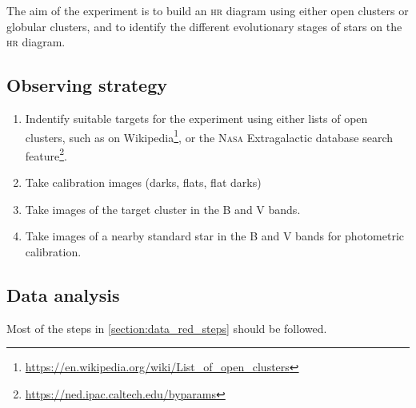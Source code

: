 \documentclass[a4paper, 11pt, fleqn]{memoir}
\begin{document}
The aim of the experiment is to build an \textsc{hr} diagram using either open clusters or globular clusters, and to identify the different evolutionary stages of stars on the \textsc{hr} diagram.

\subsection{Observing strategy}
\begin{enumerate}
    \item Indentify suitable targets for the experiment using either lists of open clusters, such as on Wikipedia\footnote{\url{https://en.wikipedia.org/wiki/List_of_open_clusters}}, or the \textsc{Nasa} Extragalactic database search feature\footnote{\url{https://ned.ipac.caltech.edu/byparams}}.
    \item Take calibration images (darks, flats, flat darks)
    \item Take images of the target cluster in the B and V bands.
    \item Take images of a nearby standard star in the B and V bands for photometric calibration.
\end{enumerate}

\subsection{Data analysis}
\label{ssec:hr-data-analysis}

Most of the steps in \cref{section:data_red_steps} should be followed.


\end{document}

